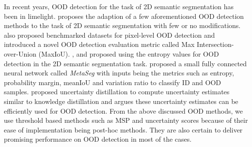     In recent years, OOD detection for the task of 2D semantic segmentation has been in limelight.
    \cite{pixel_OOD} proposes the adaption of a few aforementioned OOD detection methods to the task of 2D semantic segmentation with few or no modifications.
    \cite{pixel_OOD} also proposed benchmarked datasets for pixel-level OOD detection and introduced a novel OOD detection evaluation metric called Max Intersection-over-Union (MaxIoU).
    \cite{SemSeg_Entropy1}, and \cite{SemSeg_Entropy2} proposed using the entropy values for OOD detection in the 2D semantic segmentation task.
    \cite{MetaSeg} proposed a small fully connected neural network called \textit{MetaSeg} with inputs being the metrics such as entropy, probability margin, meanIoU and variation ratio to classify ID and OOD samples.
    \cite{uncertianty_distillation} proposed uncertainty distillation to compute uncertainty estimates similar to knowledge distillation and argues these uncertainty estimates can be efficiently used for OOD detection.
    From the above discussed OOD methods, we use threshold based methods such as MSP and uncertainty scores because of their ease of implementation being post-hoc methods.
    They are also certain to deliver promising performance on OOD detection in most of the cases.
    


